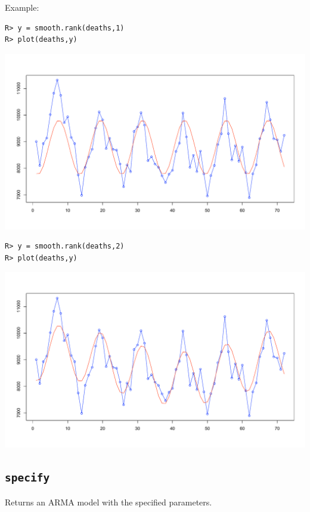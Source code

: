 \documentclass[11pt]{article}
\begin{document}
\bigskip
\noindent
Example:

\begin{verbatim}
R> y = smooth.rank(deaths,1)
R> plot(deaths,y)
\end{verbatim}

\begin{center}
\includegraphics[scale=0.3]{Rplot-14.pdf}
\end{center}

\begin{verbatim}
R> y = smooth.rank(deaths,2)
R> plot(deaths,y)
\end{verbatim}

\begin{center}
\includegraphics[scale=0.3]{Rplot-15.pdf}
\end{center}

\newpage

\subsection{\tt specify}
Returns an ARMA model with the specified parameters.
\end{document}
